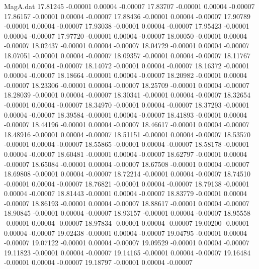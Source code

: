 \begin{filecontents}{MagA.dat}
  17.81245   -0.00001    0.00004   -0.00007
  17.83707   -0.00001    0.00004   -0.00007
  17.86157   -0.00001    0.00004   -0.00007
  17.88436   -0.00001    0.00004   -0.00007
  17.90789   -0.00001    0.00004   -0.00007
  17.93038   -0.00001    0.00004   -0.00007
  17.95423   -0.00001    0.00004   -0.00007
  17.97720   -0.00001    0.00004   -0.00007
  18.00050   -0.00001    0.00004   -0.00007
  18.02437   -0.00001    0.00004   -0.00007
  18.04729   -0.00001    0.00004   -0.00007
  18.07051   -0.00001    0.00004   -0.00007
  18.09357   -0.00001    0.00004   -0.00007
  18.11767   -0.00001    0.00004   -0.00007
  18.14072   -0.00001    0.00004   -0.00007
  18.16372   -0.00001    0.00004   -0.00007
  18.18664   -0.00001    0.00004   -0.00007
  18.20982   -0.00001    0.00004   -0.00007
  18.23306   -0.00001    0.00004   -0.00007
  18.25709   -0.00001    0.00004   -0.00007
  18.28039   -0.00001    0.00004   -0.00007
  18.30341   -0.00001    0.00004   -0.00007
  18.32654   -0.00001    0.00004   -0.00007
  18.34970   -0.00001    0.00004   -0.00007
  18.37293   -0.00001    0.00004   -0.00007
  18.39584   -0.00001    0.00004   -0.00007
  18.41893   -0.00001    0.00004   -0.00007
  18.44196   -0.00001    0.00004   -0.00007
  18.46617   -0.00001    0.00004   -0.00007
  18.48916   -0.00001    0.00004   -0.00007
  18.51151   -0.00001    0.00004   -0.00007
  18.53570   -0.00001    0.00004   -0.00007
  18.55865   -0.00001    0.00004   -0.00007
  18.58178   -0.00001    0.00004   -0.00007
  18.60481   -0.00001    0.00004   -0.00007
  18.62797   -0.00001    0.00004   -0.00007
  18.65084   -0.00001    0.00004   -0.00007
  18.67508   -0.00001    0.00004   -0.00007
  18.69808   -0.00001    0.00004   -0.00007
  18.72214   -0.00001    0.00004   -0.00007
  18.74510   -0.00001    0.00004   -0.00007
  18.76821   -0.00001    0.00004   -0.00007
  18.79138   -0.00001    0.00004   -0.00007
  18.81443   -0.00001    0.00004   -0.00007
  18.83779   -0.00001    0.00004   -0.00007
  18.86193   -0.00001    0.00004   -0.00007
  18.88617   -0.00001    0.00004   -0.00007
  18.90845   -0.00001    0.00004   -0.00007
  18.93157   -0.00001    0.00004   -0.00007
  18.95558   -0.00001    0.00004   -0.00007
  18.97834   -0.00001    0.00004   -0.00007
  19.00200   -0.00001    0.00004   -0.00007
  19.02438   -0.00001    0.00004   -0.00007
  19.04795   -0.00001    0.00004   -0.00007
  19.07122   -0.00001    0.00004   -0.00007
  19.09529   -0.00001    0.00004   -0.00007
  19.11823   -0.00001    0.00004   -0.00007
  19.14165   -0.00001    0.00004   -0.00007
  19.16484   -0.00001    0.00004   -0.00007
  19.18797   -0.00001    0.00004   -0.00007

\end{filecontents}
